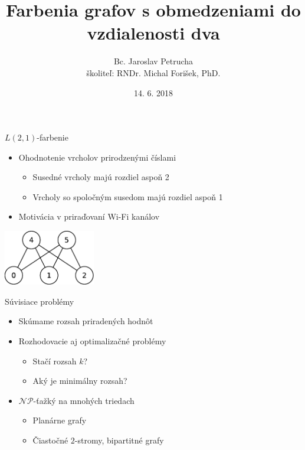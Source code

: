 \documentclass[slovak]{beamer}
\title[$L(2,1)$-farbenia grafov]{Farbenia grafov s obmedzeniami do vzdialenosti dva}
\author[Bc. Jaroslav Petrucha]{Bc. Jaroslav Petrucha \\ školiteľ: RNDr. Michal Forišek, PhD.}
\date{14. 6. 2018}
\begin{document}
\begin{frame}
\titlepage
\end{frame}

\begin{frame}{$L(2,1)$-farbenie}
    \begin{itemize}
        \item Ohodnotenie vrcholov prirodzenými číslami
        \begin{itemize}
            \item Susedné vrcholy majú rozdiel aspoň 2
            \item Vrcholy so spoločným susedom majú rozdiel aspoň 1
        \end{itemize}
        \item Motivácia v priraďovaní Wi-Fi kanálov
    \end{itemize}
    \begin{center}
        \includegraphics[width=0.3\textwidth]{grafy/l21-example.pdf}
    \end{center}
\end{frame}

\begin{frame}{Súvisiace problémy}
    \begin{itemize}
        \item Skúmame rozsah priradených hodnôt
        \item Rozhodovacie aj optimalizačné problémy
        \begin{itemize}
            \item Stačí rozsah $k$?
            \item Aký je minimálny rozsah?
        \end{itemize}
        \item{$\mathcal{NP}$-ťažký na mnohých triedach}
        \begin{itemize}
            \item Planárne grafy
            \item Čiastočné $2$-stromy, bipartitné grafy
        \end{itemize}
    \end{itemize}
\end{frame}
\end{document}
